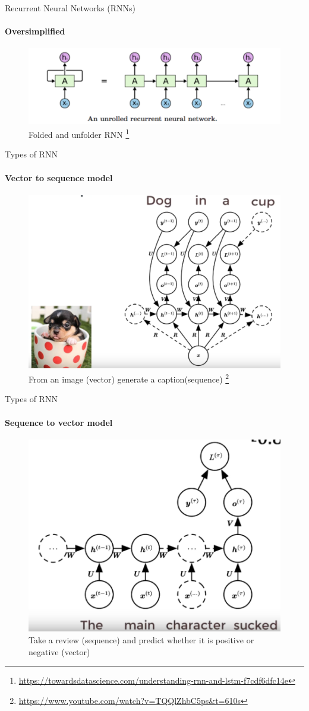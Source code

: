 \documentclass{beamer}
\begin{document}
\begin{frame}{Recurrent Neural Networks (RNNs)}
\framesubtitle{Oversimplified}

\begin{figure}
    \centering
    \includegraphics[width = .7\textwidth]{images/rnn.png}
    \caption{Folded and unfolder RNN \footnote{\url{https://towardsdatascience.com/understanding-rnn-and-lstm-f7cdf6dfc14e}}}
\end{figure}{}
    
\end{frame}




\begin{frame}{Types of RNN}
\framesubtitle{Vector to sequence model}
\begin{figure}
    \centering
    \includegraphics[width = .6\textwidth]{images/vec-2-sec.png}
    \caption{From an image (vector) generate a caption(sequence) \footnote{\url{https://www.youtube.com/watch?v=TQQlZhbC5ps&t=610s}}}
\end{figure}{}
    
\end{frame}




\begin{frame}{Types of RNN}
\framesubtitle{Sequence to vector model}
\begin{figure}
    \centering
    \includegraphics[width = .5\textwidth]{images/seq-2-vec.png}
    \caption{Take a review (sequence) and predict whether it is positive or negative (vector)\footnotemark[7]
    }
\end{figure}{}
    
\end{frame}
\end{document}
